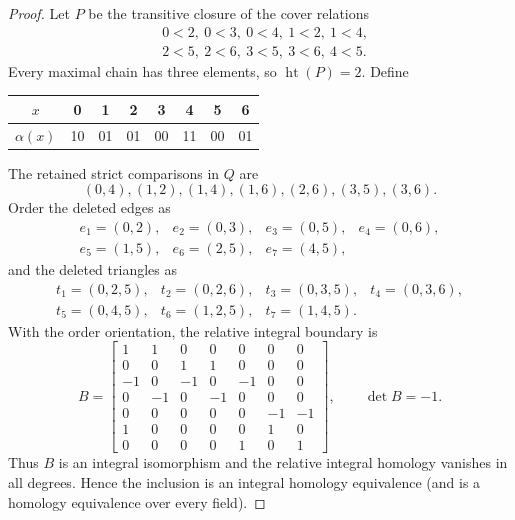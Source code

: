 \documentclass[11pt]{article}
\theoremstyle{definition}
\theoremstyle{remark}
\DeclareMathOperator{\posht}{ht}
\begin{document}
\begin{proof}
Let $P$ be the transitive closure of the cover relations
\begin{equation}\label{eq:seven-covers}
\begin{split}
&0<2,\ 0<3,\ 0<4,\ 1<2,\ 1<4,\\
&2<5,\ 2<6,\ 3<5,\ 3<6,\ 4<5.
\end{split}
\end{equation}
Every maximal chain has three elements, so $\posht(P)=2$.  Define
\begin{center}
\begin{tabular}{c@{\qquad}ccccccc}
\toprule
$x$ & 0&1&2&3&4&5&6\\
\midrule
$\alpha(x)$ & 10&01&01&00&11&00&01\\
\bottomrule
\end{tabular}
\end{center}
The retained strict comparisons in $Q$ are
\begin{equation}\label{eq:seven-Q}
  (0,4),(1,2),(1,4),(1,6),(2,6),(3,5),(3,6).
\end{equation}
Order the deleted edges as
\[
\begin{array}{llll}
 e_1=(0,2),&e_2=(0,3),&e_3=(0,5),&e_4=(0,6),\\
 e_5=(1,5),&e_6=(2,5),&e_7=(4,5),
\end{array}
\]
and the deleted triangles as
\[
\begin{array}{llll}
 t_1=(0,2,5),&t_2=(0,2,6),&t_3=(0,3,5),&t_4=(0,3,6),\\
 t_5=(0,4,5),&t_6=(1,2,5),&t_7=(1,4,5).
\end{array}
\]
With the order orientation, the relative integral boundary is
\begin{equation}\label{eq:seven-matrix}
B=
\begin{bmatrix}
 1& 1& 0& 0& 0& 0& 0\\
 0& 0& 1& 1& 0& 0& 0\\
-1& 0&-1& 0&-1& 0& 0\\
 0&-1& 0&-1& 0& 0& 0\\
 0& 0& 0& 0& 0&-1&-1\\
 1& 0& 0& 0& 0& 1& 0\\
 0& 0& 0& 0& 1& 0& 1
\end{bmatrix},
\qquad \det B=-1.
\end{equation}
Thus $B$ is an integral isomorphism and the relative integral homology vanishes in
all degrees.  Hence the inclusion is an integral homology equivalence (and is a
homology equivalence over every field).


\end{proof}
\end{document}
